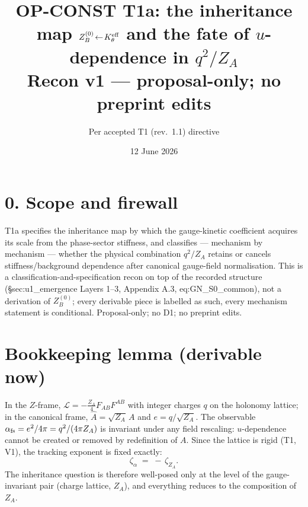 \documentclass[11pt,a4paper]{article}
\title{\textbf{OP-CONST T1a: the inheritance map $Z_B^{(0)}\!\leftarrow\!
K_\theta^{\rm eff}$ and the fate of $u$-dependence in $q^2/Z_A$}\\\large Recon v1
--- proposal-only; no preprint edits}
\author{Per accepted T1 (rev.~1.1) directive}
\date{12 June 2026}
\begin{document}
\maketitle

\section*{0. Scope and firewall}
T1a specifies the inheritance map by which the gauge-kinetic coefficient acquires
its scale from the phase-sector stiffness, and classifies --- mechanism by
mechanism --- whether the physical combination $q^2/Z_A$ retains or cancels
stiffness/background dependence after canonical gauge-field normalisation. This is
a classification-and-specification recon on top of the recorded structure
(\S sec:u1\_emergence Layers 1--3, Appendix A.3, eq:GN\_S0\_common), not a
derivation of $Z_B^{(0)}$; every derivable piece is labelled as such, every
mechanism statement is conditional. Proposal-only; no D1; no preprint edits.

\section{Bookkeeping lemma (derivable now)}
In the $Z$-frame, $\mathcal L=-\tfrac{Z_A}{4}F_{AB}F^{AB}$ with integer charges
$q$ on the holonomy lattice; in the canonical frame, $\hat A=\sqrt{Z_A}\,A$ and
$e=q/\sqrt{Z_A}$. The observable $\alpha_{\rm fs}=e^2/4\pi=q^2/(4\pi Z_A)$ is
invariant under any field rescaling: $u$-dependence cannot be created or removed
by redefinition of $A$. Since the lattice is rigid (T1, V1), the tracking exponent
is fixed exactly:
\[
\zeta_\alpha\;=\;-\,\zeta_{Z_A}.
\]
The inheritance question is therefore well-posed only at the level of the
gauge-invariant pair (charge lattice, $Z_A$), and everything reduces to the
composition of $Z_A$.
\end{document}
